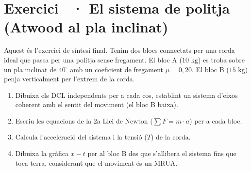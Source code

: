 \documentclass[12pt,a4paper,twoside]{article}
\newcounter{exercici}
\newcommand{\exercici}[1]{%
  \stepcounter{exercici}
  \section*{Exercici \theexercici\ \textnormal{· #1}}
  \vspace{-10pt}
}
\begin{document}
\vspace{0.5cm}
\exercici{El sistema de politja (Atwood al pla inclinat)}
Aquest és l'exercici de síntesi final. Tenim dos blocs connectats per una corda ideal que passa per una politja sense fregament. El bloc A ($10 \text{ kg}$) es troba sobre un pla inclinat de $40^\circ$ amb un coeficient de fregament $\mu = 0{,}20$. El bloc B ($15 \text{ kg}$) penja verticalment per l'extrem de la corda.
\begin{enumerate}[label=\textbf{\alph*)}]
  \item Dibuixa els DCL independents per a cada cos, establint un sistema d'eixos coherent amb el sentit del moviment (el bloc B baixa).
  \item Escriu les equacions de la 2a Llei de Newton ($\sum F = m \cdot a$) per a cada bloc.
  \item Calcula l'acceleració del sistema i la tensió ($T$) de la corda.
  \item Dibuixa la gràfica $x-t$ per al bloc B des que s'allibera el sistema fins que toca terra, considerant que el moviment és un MRUA.
\end{enumerate}
\end{document}
